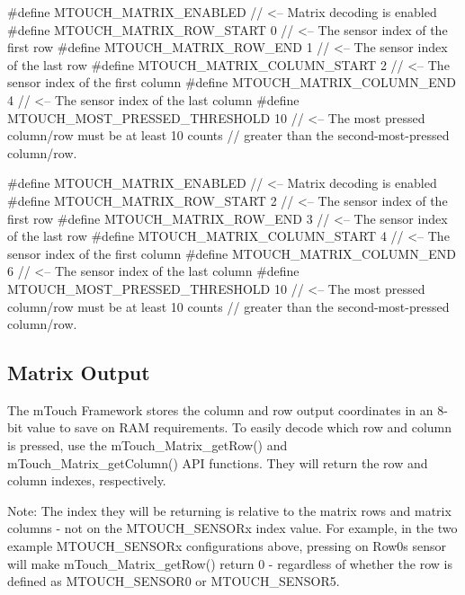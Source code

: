 \begin{DoxyCode}
\textcolor{preprocessor}{#define MTOUCH\_MATRIX\_ENABLED               // <-- Matrix decoding is enabled}
\textcolor{preprocessor}{#define MTOUCH\_MATRIX\_ROW\_START         0   // <-- The sensor index of the first row}
\textcolor{preprocessor}{#define MTOUCH\_MATRIX\_ROW\_END           1   // <-- The sensor index of the last row}
\textcolor{preprocessor}{#define MTOUCH\_MATRIX\_COLUMN\_START      2   // <-- The sensor index of the first column}
\textcolor{preprocessor}{#define MTOUCH\_MATRIX\_COLUMN\_END        4   // <-- The sensor index of the last column}
\textcolor{preprocessor}{#define MTOUCH\_MOST\_PRESSED\_THRESHOLD   10  // <-- The most pressed column/row must be at least 10 counts}
\textcolor{preprocessor}{                                            //     greater than the second-most-pressed column/row.}
\end{DoxyCode}
 
\begin{DoxyCode}
\textcolor{preprocessor}{#define MTOUCH\_MATRIX\_ENABLED               // <-- Matrix decoding is enabled}
\textcolor{preprocessor}{#define MTOUCH\_MATRIX\_ROW\_START         2   // <-- The sensor index of the first row}
\textcolor{preprocessor}{#define MTOUCH\_MATRIX\_ROW\_END           3   // <-- The sensor index of the last row}
\textcolor{preprocessor}{#define MTOUCH\_MATRIX\_COLUMN\_START      4   // <-- The sensor index of the first column}
\textcolor{preprocessor}{#define MTOUCH\_MATRIX\_COLUMN\_END        6   // <-- The sensor index of the last column}
\textcolor{preprocessor}{#define MTOUCH\_MOST\_PRESSED\_THRESHOLD   10  // <-- The most pressed column/row must be at least 10 counts}
\textcolor{preprocessor}{                                            //     greater than the second-most-pressed column/row.}
\end{DoxyCode}
\hypertarget{feat_matrix_featMatrix-Out}{}\subsection{Matrix Output}\label{feat_matrix_featMatrix-Out}
The m\+Touch Framework stores the column and row output coordinates in an 8-\/bit value to save on R\+A\+M requirements. To easily decode which row and column is pressed, use the m\+Touch\+\_\+\+Matrix\+\_\+get\+Row() and m\+Touch\+\_\+\+Matrix\+\_\+get\+Column() A\+P\+I functions. They will return the row and column indexes, respectively.

Note\+: The index they will be returning is relative to the matrix rows and matrix columns -\/ not on the M\+T\+O\+U\+C\+H\+\_\+\+S\+E\+N\+S\+O\+Rx index value. For example, in the two example M\+T\+O\+U\+C\+H\+\_\+\+S\+E\+N\+S\+O\+Rx configurations above, pressing on Row0\textquotesingle{}s sensor will make m\+Touch\+\_\+\+Matrix\+\_\+get\+Row() return \textquotesingle{}0\textquotesingle{} -\/ regardless of whether the row is defined as M\+T\+O\+U\+C\+H\+\_\+\+S\+E\+N\+S\+O\+R0 or M\+T\+O\+U\+C\+H\+\_\+\+S\+E\+N\+S\+O\+R5.

